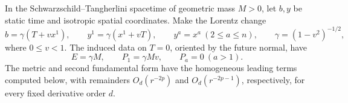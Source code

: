 \begin{lemma}
\label{lem:end:boost}
In the Schwarzschild--Tangherlini spacetime of geometric mass $M>0$,
let $b,y$ be static time and isotropic spatial coordinates.  Make the
Lorentz change
\begin{equation}\label{eq:end:boost-coordinates}
 b=\gamma(T+vx^1),\qquad y^1=\gamma(x^1+vT),\qquad
 y^a=x^a\ (2\le a\le n),\qquad \gamma=(1-v^2)^{-1/2},
\end{equation}
where $0\le v<1$.  The induced data on $T=0$, oriented by the
future normal, have
\begin{equation}\label{eq:end:boost-charges}
 E=\gamma M,\qquad P_1=\gamma Mv,\qquad P_a=0\ (a>1).
\end{equation}
The metric and second fundamental form have the homogeneous leading
terms computed below, with remainders $O_d(r^{-2p})$ and
$O_d(r^{-2p-1})$, respectively, for every fixed derivative order $d$.
\end{lemma}


